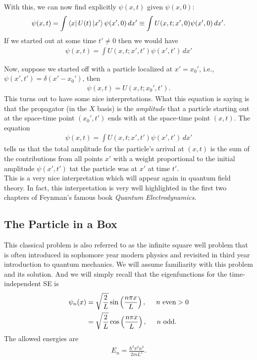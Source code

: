 \documentclass{book}
\theoremstyle{definition}
\newcommand{\f}[2]{\frac{#1}{#2}}
\newcommand{\lp}{\left(}
\newcommand{\rp}{\right)}
\begin{document}
With this, we can now find explicitly $\psi(x,t)$ given $\psi(x,0)$:
\begin{align}
\psi(x,t) =\int \bra{x}U(t)\ket{x'}  \psi(x',0)\,dx' \equiv \int U(x,t;x',0)  \psi(x',0)\,dx'.
\end{align}
If we started out at some time $t'\neq 0$ then we would have 
\begin{align}
\boxed{\psi(x,t) =\int U(x,t;x',t')  \psi(x',t')\,dx'}
\end{align}

Now, suppose we started off with a particle localized at $x' = x_0'$, i.e., $\psi(x',t') = \delta(x'-x_0')$, then
\begin{align}
\psi(x,t) = U(x,t;x_0',t').
\end{align}
This turns out to have some nice interpretations. What this equation is saying is that the propagator (in the $X$ basis) is the \textit{amplitude} that a particle starting out at the space-time point $(x_0',t')$ ends with at the space-time point $(x,t)$. The equation 
\begin{align}
\psi(x,t) =\int U(x,t;x',t')  \psi(x',t')\,dx'
\end{align}
tells us that the total amplitude for the particle's arrival at $(x,t)$ is the sum of the contributions from all points $x'$ with a weight proportional to the initial amplitude $\psi(x',t')$ tat the particle was at $x'$ at time $t'$. \\

This is a very nice interpretation which will appear again in quantum field theory. In fact, this interpretation is very well highlighted in the first two chapters of Feynman's famous book \textit{Quantum Electrodynamics}. 






\subsection{The Particle in a Box}

This classical problem is also referred to as the infinite square well problem that is often introduced in sophomore year modern physics and revisited in third year introduction to quantum mechanics. We will assume familiarity with this problem and its solution. And we will simply recall that the eigenfunctions for the time-independent SE is 
\begin{align}
\psi_n(x) &= \sqrt{\f{2}{L}}\sin\lp \f{n\pi x}{L} \rp, \hspace{0.5cm}n\text{ even} > 0\\
&=\sqrt{\f{2}{L}}\cos\lp \f{n\pi x}{L} \rp, \hspace{0.5cm}n\text{ odd}.
\end{align}
The allowed energies are
\begin{align}
E_n = \f{\hbar^2 \pi^2 n^2}{2mL^2}.
\end{align}
\end{document}

